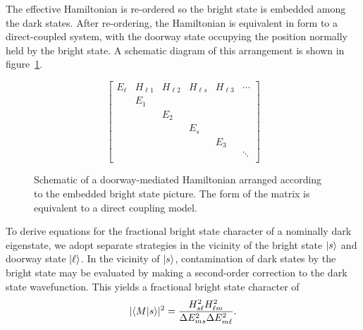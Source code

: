 The effective Hamiltonian is re-ordered so the bright state is
embedded among the dark states.  After re-ordering, the Hamiltonian is
equivalent in form to a direct-coupled system, with the doorway state
occupying the position normally held by the bright state.  A schematic
diagram of this arrangement is shown in figure~\ref{fig:matrix-ebsa}.

\begin{figure}
  \caption{Schematic of a doorway-mediated Hamiltonian arranged
    according to the embedded bright state picture. The form of the
    matrix is equivalent to a direct coupling model.}
  \label{fig:matrix-ebsa}
  \begin{equation*}
    \begin{bmatrix}
      E_\ell & H_{\ell 1} & H_{\ell 2} & H_{\ell s} & H_{\ell 3} & \dotsm \\
      & E_1 \\
      & & E_2 \\
      & & & E_s \\
      & & & & E_3 \\
      & & & & & \ddots \\
    \end{bmatrix}
  \end{equation*}
\end{figure}

To derive equations for the fractional bright state character of a
nominally dark eigenstate, we adopt separate strategies in the vicinity
of the bright state $\mathinner{|{s}\rangle}$ and doorway state $\mathinner{|{\ell}\rangle}$.  In the
vicinity of $\mathinner{|{s}\rangle}$, contamination of dark states by the bright
state may be evaluated by making a second-order correction to the dark
state wavefunction.  This yields a fractional bright state character
of
\begin{equation}\label{eq:ebsa-bright-int}
\lvert \mathinner{\langle{M|s}\rangle} \rvert^2 = 
    \frac{H_{s\ell}^2 H_{\ell m}^2}{\Delta E_{ms}^2 \Delta E_{m\ell}^2}.
\end{equation}

